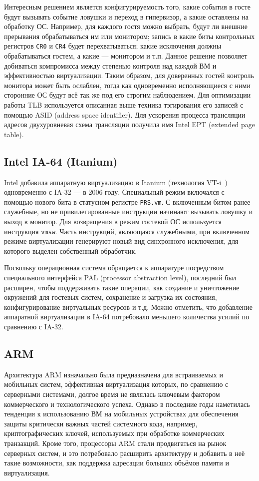 Интересным решением является конфигурируемость того, какие события в госте будут вызывать событие ловушки и переход в гипервизор, а какие оставлены на обработку ОС. Например, для каждого гостя можно выбрать, будут ли внешние прерывания обрабатываться им или монитором; запись в какие биты контрольных регистров \texttt{CR0} и \texttt{CR4} будет перехватываться; какие исключения должны обрабатываться гостем, а какие — монитором и т.п. Данное решение позволяет добиваться компромисса между степенью контроля над каждой ВМ и эффективностью виртуализации. Таким образом, для доверенных гостей контроль монитора может быть ослаблен, тогда как одновременно исполняющиеся с ними сторонние ОС будут всё так же под его строгим наблюдением. Для оптимизации работы TLB используется описанная выше техника тэгирования его записей с помощью ASID (\abbr address space identifier). Для ускорения процесса трансляции адресов двухуровневая схема трансляции получила имя Intel EPT (\abbr extended page table).

\subsection{Intel IA-64 (Itanium)}

Intel добавила аппаратную виртуализацию в Itanium (технология VT-i~\cite{vtx}) одновременно с IA-32 — в 2006 году. Специальный режим включался с помощью нового бита в статусном регистре \texttt{PRS.vm}. С включенным битом ранее служебные, но не привилегированные инструкции начинают вызывать ловушку и выход в монитор. Для возвращения в режим гостевой ОС используется инструкция \texttt{vmsw}. Часть инструкций, являющаяся служебными, при включенном режиме виртуализации генерируют новый вид синхронного исключения, для которого выделен собственный обработчик.

Поскольку операционная система обращается к аппаратуре посредством специального интерфейса PAL (\abbr processor abstraction level), последний был расширен, чтобы поддерживать такие операции, как создание и уничтожение окружений для гостевых систем, сохранение и загрузка их состояния, конфигурирование виртуальных ресурсов и т.д. Можно отметить, что добавление аппаратной виртуализации в IA-64 потребовало меньшего количества усилий по сравнению с IA-32.

\subsection{ARM}

Архитектура ARM изначально была предназначена для встраиваемых и мобильных систем, эффективная виртуализация которых, по сравнению с серверными системами, долгое время не являлась ключевым фактором коммерческого и технологического успеха. Однако в последние годы наметилась тенденция к использованию ВМ на мобильных устройствах для обеспечения защиты критически важных частей системного кода, например, криптографических ключей, используемых при обработке коммерческих транзакций. Кроме того, процессоры ARM стали продвигаться на рынок серверных систем, и это потребовало расширить архитектуру и добавить в неё такие возможности, как поддержка адресации больших объёмов памяти и виртуализация.

